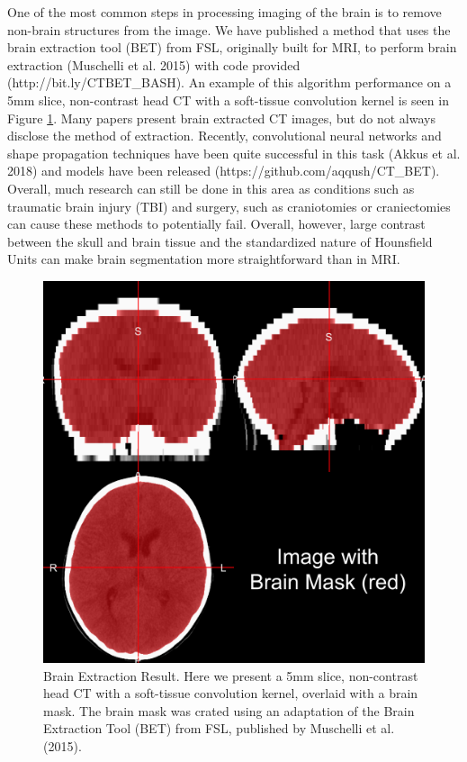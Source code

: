 \documentclass[]{elsarticle} %
\begin{document}
One of the most common steps in processing imaging of the brain is to remove non-brain structures from the image. We have published a method that uses the brain extraction tool (BET) from FSL, originally built for MRI, to perform brain extraction (Muschelli et al. 2015) with code provided (http://bit.ly/CTBET\_BASH). An example of this algorithm performance on a 5mm slice, non-contrast head CT with a soft-tissue convolution kernel is seen in Figure \ref{fig:ss}. Many papers present brain extracted CT images, but do not always disclose the method of extraction. Recently, convolutional neural networks and shape propagation techniques have been quite successful in this task (Akkus et al. 2018) and models have been released (https://github.com/aqqush/CT\_BET). Overall, much research can still be done in this area as conditions such as traumatic brain injury (TBI) and surgery, such as craniotomies or craniectomies can cause these methods to potentially fail. Overall, however, large contrast between the skull and brain tissue and the standardized nature of Hounsfield Units can make brain segmentation more straightforward than in MRI.

\begin{figure}
\includegraphics[width=1\linewidth]{ss_image} \caption{Brain Extraction Result.  Here we present a 5mm slice, non-contrast head CT with a soft-tissue convolution kernel, overlaid with a brain mask.  The brain mask was crated using an adaptation of the Brain Extraction Tool (BET) from FSL, published by Muschelli et al. (2015).}\label{fig:ss}
\end{figure}
\end{document}
